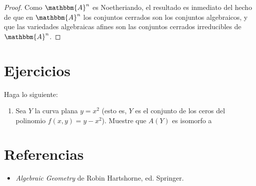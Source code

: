 \documentclass[12pt]{report}
\theoremstyle{largebreak}
\newcommand{\bbm}[1]{\ensuremath{\mathbbm{#1}}}
\begin{document}
    \begin{proof}
        Como $\bbm{A}^n$ es Noetheriando, el resultado es inmediato del hecho de que en $\bbm{A}^n$ los conjuntos cerrados son los conjuntos algebraicos, y que las variedades algebraicas afines son las conjuntos cerrados irreducibles de $\bbm{A}^n$.
    \end{proof}

    \begin{mydef}
        
    \end{mydef}

    \newpage

    \section{Ejercicios}

    \begin{excer}
        Haga lo siguiente:
        \begin{enumerate}[label=(\textit{\alph*})]
            \item Sea $Y$ la curva plana $y=x^2$ (esto es, $Y$ es el conjunto de los ceros del polinomio $f(x,y)=y-x^2$). Muestre que $A(Y)$ es isomorfo a 
        \end{enumerate}
    \end{excer}

    \newpage

    \section{Referencias}

    \begin{itemize}
        \item \textit{Algebraic Geometry} de Robin Hartshorne, ed. Springer.
    \end{itemize}
\end{document}
